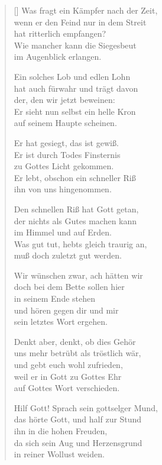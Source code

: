 \begin{multicols}{2}
\begin{verse}[\versewidth]
 Was fragt ein Kämpfer nach der Zeit,\\
wenn er den Feind nur in dem Streit\\
hat ritterlich empfangen?\\
Wie mancher kann die Siegesbeut\\
im Augenblick erlangen.

 Ein solches Lob und edlen Lohn\\
hat auch fürwahr und trägt davon\\
der, den wir jetzt beweinen:\\
Er sieht nun selbst ein helle Kron\\
auf seinem Haupte scheinen.

 Er hat gesiegt, das ist gewiß.\\
Er ist durch Todes Finsternis\\
zu Gottes Licht gekommen.\\
Er lebt, obschon ein schneller Riß\\
ihn von uns hingenommen.

 Den schnellen Riß hat Gott getan,\\
der nichts als Gutes machen kann\\
im Himmel und auf Erden.\\
Was gut tut, hebts gleich traurig an,\\
muß doch zuletzt gut werden.

 Wir wünschen zwar, ach hätten wir\\
doch bei dem Bette sollen hier\\
in seinem Ende stehen\\
und hören gegen dir und mir\\
sein letztes Wort ergehen.

 Denkt aber, denkt, ob dies Gehör\\
uns mehr betrübt als tröstlich wär,\\
und gebt euch wohl zufrieden,\\
weil er in Gott zu Gottes Ehr\\
auf Gottes Wort verschieden.

 Hilf Gott! Sprach sein gottselger Mund,\\
das hörte Gott, und half zur Stund\\
ihn in die hohen Freuden,\\
da sich sein Aug und Herzensgrund\\
in reiner Wollust weiden.


\end{verse}
\end{multicols}
